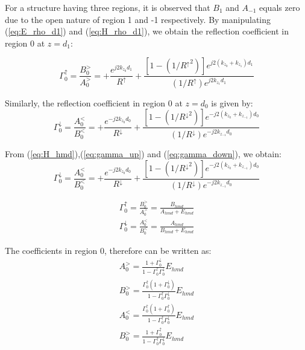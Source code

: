 \documentclass[11pt]{article}
\begin{document}
  For a structure having three regions, it is observed that $B_1$ and $A_{-1}$ equals zero due to the open nature of region 1 and -1 respectively. By manipulating (\ref{eq:E_rho_d1}) and (\ref{eq:H_rho_d1}), we obtain the reflection coefficient in region 0 at $z=d_1$:

  \begin{equation}
    \Gamma_0^{\uparrow} = \frac{B_0^>}{A_0^>} = +\frac{e^{j2k_{z_0} d_1}}{R^{\uparrow}} + \frac{ \left[ 1 - (1/{R^{\uparrow}}^2) \right]e^{j2(k_{z_0} + k_{z_1}) d_1}}{(1/R^{\uparrow})e^{j2k_{z_1} d_1}}
    \label{eq:gamma_up}
  \end{equation}

  Similarly, the reflection coefficient in region 0 at $z=d_0$ is given by:
  \begin{equation}
    \Gamma_0^{\downarrow} = \frac{A_0^<}{B_0^<} = +\frac{e^{-j2k_{z_0} d_0}}{R^{\downarrow}} + \frac{ \left[ 1 - (1/{R^{\downarrow}}^2) \right]e^{-j2(k_{z_0} + k_{z_{-1}}) d_0}}{(1/R^{\downarrow})e^{-j2k_{z_{-1}} d_0}}
    \label{eq:gamma_down}
  \end{equation}

  From (\ref{eq:H_hmd}),(\ref{eq:gamma_up}) and (\ref{eq:gamma_down}), we obtain:
  \begin{equation}
    \Gamma_0^{\downarrow} = \frac{A_0^<}{B_0^<} = +\frac{e^{-j2k_{z_0} d_0}}{R^{\downarrow}} + \frac{ \left[ 1 - (1/{R^{\downarrow}}^2) \right]e^{-j2(k_{z_0} + k_{z_{-1}}) d_0}}{(1/R^{\downarrow})e^{-j2k_{z_{-1}} d_0}}
    \label{eq:gamma_down}
  \end{equation}

  \begin{subequations}
    \begin{align}
      \Gamma_0^{\uparrow} = \frac{B_0^>}{A_0^>} = \frac{B_{hmd}}{A_{hmd} + E_{hmd}}
      \label{eq:gamma_0_up} \\
      \Gamma_0^{\downarrow} = \frac{A_0^<}{B_0^<} = \frac{A_{hmd}}{B_{hmd} + E_{hmd}}
      \label{eq:gamma_0_down}
    \end{align}
    \label{eq:gammas}
  \end{subequations}

  The coefficients in region 0, therefore can be written as:
  \begin{subequations}
    \begin{align}
      A_0^> = \frac{1 + \Gamma_0^{\downarrow}}{1- \Gamma_0^{\uparrow} \Gamma_0^{\downarrow}} E_{hmd}
      \label{eq:A0up} \\
      B_0^> = \frac{\Gamma_0^{\uparrow}(1 + \Gamma_0^{\downarrow})}{1- \Gamma_0^{\uparrow} \Gamma_0^{\downarrow}} E_{hmd}
      \label{eq:B0up} \\
      A_0^< = \frac{\Gamma_0^{\uparrow}(1 + \Gamma_0^{\uparrow})}{1- \Gamma_0^{\uparrow} \Gamma_0^{\downarrow}} E_{hmd}
      \label{eq:A0up} \\
      B_0^> = \frac{1 + \Gamma_0^{\uparrow}}{1- \Gamma_0^{\uparrow} \Gamma_0^{\downarrow}} E_{hmd}
      \label{eq:B0up} \\
    \end{align}
    \label{eq:coefficients}
  \end{subequations}
\end{document}
